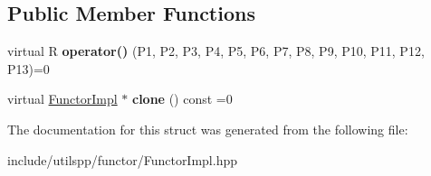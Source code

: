 \subsection*{Public Member Functions}
\begin{DoxyCompactItemize}
\item 
\hypertarget{structutilspp_1_1FunctorImpl_3_01R_00_01TYPE__LIST__13_07P1_00_01P2_00_01P3_00_01P4_00_01P5_00_0c958a377a1633cfded06d0625afe62c5_a6a95e9f3b9b281cbe20fcb3bb2a458ee}{virtual R {\bfseries operator()} (P1, P2, P3, P4, P5, P6, P7, P8, P9, P10, P11, P12, P13)=0}\label{structutilspp_1_1FunctorImpl_3_01R_00_01TYPE__LIST__13_07P1_00_01P2_00_01P3_00_01P4_00_01P5_00_0c958a377a1633cfded06d0625afe62c5_a6a95e9f3b9b281cbe20fcb3bb2a458ee}

\item 
\hypertarget{structutilspp_1_1FunctorImpl_3_01R_00_01TYPE__LIST__13_07P1_00_01P2_00_01P3_00_01P4_00_01P5_00_0c958a377a1633cfded06d0625afe62c5_ae28b57b5d13dbd0d0493318edf4282a9}{virtual \hyperlink{structutilspp_1_1FunctorImpl}{Functor\-Impl} $\ast$ {\bfseries clone} () const =0}\label{structutilspp_1_1FunctorImpl_3_01R_00_01TYPE__LIST__13_07P1_00_01P2_00_01P3_00_01P4_00_01P5_00_0c958a377a1633cfded06d0625afe62c5_ae28b57b5d13dbd0d0493318edf4282a9}

\end{DoxyCompactItemize}


The documentation for this struct was generated from the following file\-:\begin{DoxyCompactItemize}
\item 
include/utilspp/functor/Functor\-Impl.\-hpp\end{DoxyCompactItemize}
